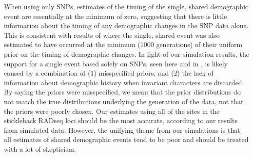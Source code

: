 \ifembed{

}{}

When using only SNPs, estimates of the timing of the single, shared demographic
event are essentially at the minimum of zero, suggesting that there is little
information about the timing of any demographic changes in the SNP data alone.
This is consistent with results of \citet{Xue2015} where the single, shared
event was also estimated to have occurred at the minimum (1000 generations) of
their uniform prior on the timing of demographic changes.
In light of our simulation results, the support for a single event based solely
on SNPs, seen here and in \citet{Xue2015}, is likely caused by a combination of
(1) misspecified priors, and
(2) the lack of information about demographic history when invariant characters
are discarded.
By saying the priors were misspecified, we mean that the prior distributions do
not match the true distributions underlying the generation of the data, not
that the priors were poorly chosen.
Our estimates using all of the sites in the stickleback RADseq loci should be
the most accurate, according to our results from simulated data.
However, the unifying theme from our simulations is that all estimates of
shared demographic events tend to be poor and should be treated with a lot of
skepticism.
